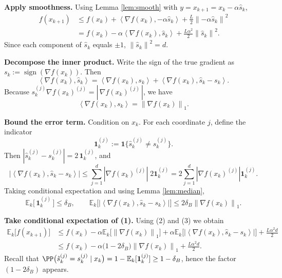 \documentclass{article}
\newcommand{\sign}{\operatorname{sign}}
\newcommand{\EE}{\mathbb{E}}
\newcommand{\norm}[1]{\left\|#1\right\|}
\newcommand{\inner}[2]{\left\langle #1,#2\right\rangle}
\newcommand{\grad}{\nabla}
\begin{document}
\begin{enumerate}[label={[\textbf{Step \arabic*}]}]
\item \textbf{Apply smoothness.}  
Using Lemma \ref{lem:smooth} with $y=x_{k+1}=x_{k}-\alpha\hat{s}_{k}$,
\begin{align}
f(x_{k+1})
&\le f(x_{k})+\inner{\grad f(x_{k})}{-\alpha\hat{s}_{k}}
+\frac{L}{2}\norm{-\alpha\hat{s}_{k}}^{2} \nonumber\\
&= f(x_{k})-\alpha\inner{\grad f(x_{k})}{\hat{s}_{k}}
+\frac{L\alpha^{2}}{2}\norm{\hat{s}_{k}}^{2}. \tag{1}
\end{align}
Since each component of $\hat{s}_{k}$ equals $\pm1$, $\norm{\hat{s}_{k}}^{2}=d$.

\item \textbf{Decompose the inner product.}  
Write the sign of the true gradient as $s_{k}:=\sign(\grad f(x_{k}))$.  Then
\[
\inner{\grad f(x_{k})}{\hat{s}_{k}}
=\inner{\grad f(x_{k})}{s_{k}}+
\inner{\grad f(x_{k})}{\hat{s}_{k}-s_{k}}.
\]
Because $s_{k}^{(j)}\grad f(x_{k})^{(j)}=|\,\grad f(x_{k})^{(j)}\,|$, we have
\[
\inner{\grad f(x_{k})}{s_{k}} = \norm{\grad f(x_{k})}_{1}. \tag{2}
\]

\item \textbf{Bound the error term.}  
Condition on $x_{k}$. For each coordinate $j$, define the indicator
\[
\mathbf{1}_{k}^{(j)}:=\mathbf{1}\big\{\hat{s}_{k}^{(j)}\neq s_{k}^{(j)}\big\}.
\]
Then $|\hat{s}_{k}^{(j)}-s_{k}^{(j)}| = 2\,\mathbf{1}_{k}^{(j)}$, and
\[
\big|\inner{\grad f(x_{k})}{\hat{s}_{k}-s_{k}}\big|
\le \sum_{j=1}^{d} |\grad f(x_{k})^{(j)}|\;2\mathbf{1}_{k}^{(j)}
=2\sum_{j=1}^{d} |\grad f(x_{k})^{(j)}|\mathbf{1}_{k}^{(j)} .
\]
Taking conditional expectation and using Lemma \ref{lem:median},
\[
\EE_{k}\!\big[\,\mathbf{1}_{k}^{(j)}\,\big]\le\delta_{B},\qquad
\EE_{k}\!\big[\big|\inner{\grad f(x_{k})}{\hat{s}_{k}-s_{k}}\big|\big]
\le 2\delta_{B}\norm{\grad f(x_{k})}_{1}. \tag{3}
\]

\item \textbf{Take conditional expectation of (1).}  
Using (2) and (3) we obtain
\begin{align}
\EE_{k}\big[f(x_{k+1})\big]
&\le f(x_{k})-\alpha\EE_{k}\!\big[\norm{\grad f(x_{k})}_{1}\big]
+\alpha\EE_{k}\!\big[\big|\inner{\grad f(x_{k})}{\hat{s}_{k}-s_{k}}\big|\big]
+\frac{L\alpha^{2}d}{2} \nonumber\\
&\le f(x_{k})-\alpha\big(1-2\delta_{B}\big)\norm{\grad f(x_{k})}_{1}
+\frac{L\alpha^{2}d}{2}. \tag{4}
\end{align}
Recall that $\PP\big(\hat{s}_{k}^{(j)}=s_{k}^{(j)}\mid x_{k}\big)=1-\EE_{k}[\mathbf{1}_{k}^{(j)}]\ge 1-\delta_{B}$,
hence the factor $(1-2\delta_{B})$ appears.


\end{enumerate}
\end{document}
